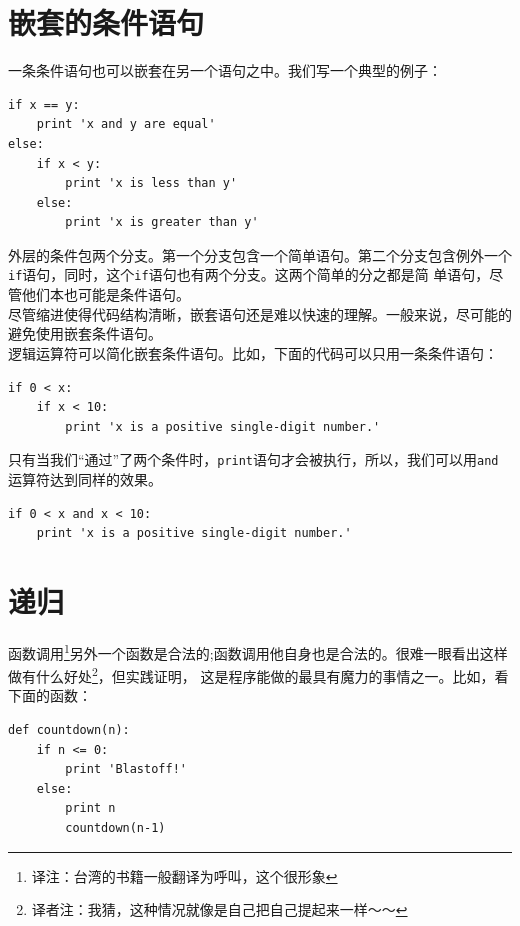{\section{嵌套的条件语句}

一条条件语句也可以嵌套在另一个语句之中。我们写一个典型的例子：

\beforeverb
\begin{verbatim}
if x == y:
    print 'x and y are equal'
else:
    if x < y:
        print 'x is less than y'
    else:
        print 'x is greater than y'
\end{verbatim}
\afterverb
外层的条件包两个分支。第一个分支包含一个简单语句。第二个分支包含例外一个
{\tt if}语句，同时，这个{\tt if}语句也有两个分支。这两个简单的分之都是简
单语句，尽管他们本也可能是条件语句。\\

尽管缩进使得代码结构清晰，嵌套语句还是难以快速的理解。一般来说，尽可能的
避免使用嵌套条件语句。\\

逻辑运算符可以简化嵌套条件语句。比如，下面的代码可以只用一条条件语句：

\beforeverb
\begin{verbatim}
if 0 < x:
    if x < 10:
        print 'x is a positive single-digit number.'
\end{verbatim}
\afterverb

只有当我们“通过”了两个条件时，{\tt print}语句才会被执行，所以，我们可以用{\tt and}运算符达到同样的效果。

\beforeverb
\begin{verbatim}
if 0 < x and x < 10:
    print 'x is a positive single-digit number.'
\end{verbatim}
\afterverb
 


\section{递归}
\label{recusion}


函数调用\footnote{译注：台湾的书籍一般翻译为呼叫，这个很形象}另外一个函数是合法的;函数调用他自身也是合法的。很难一眼看出这样做有什么好处\footnote{译者注：我猜，这种情况就像是自己把自己提起来一样～～}，但实践证明，
这是程序能做的最具有魔力的事情之一。比如，看下面的函数：

\beforeverb
\begin{verbatim}
def countdown(n):
    if n <= 0:
        print 'Blastoff!'
    else:
        print n
        countdown(n-1)
\end{verbatim}
\afterverb

}
